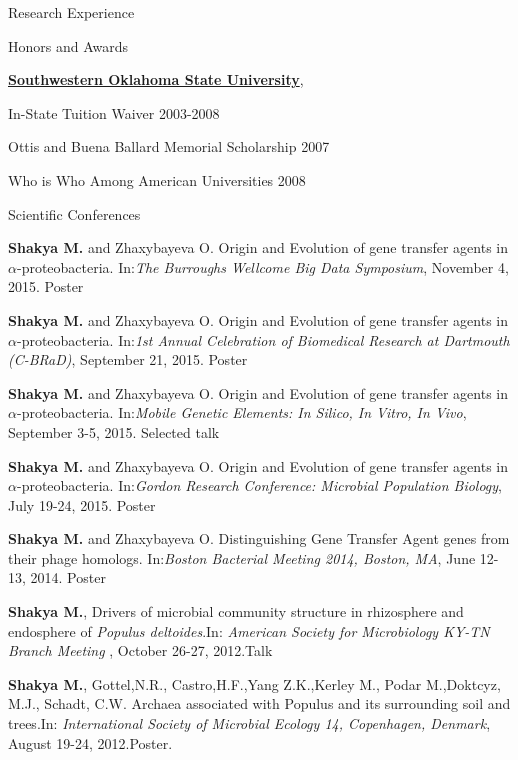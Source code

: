 \documentclass{resume} %
\begin{document}
\begin{rSection}{Research Experience}
\begin{rSection}{Honors and Awards}
\item \href{http://www.swosu.edu}{\textbf{Southwestern Oklahoma State University}},
\item In-State Tuition Waiver 2003-2008
\item Ottis and Buena Ballard Memorial Scholarship 2007
\item Who is Who Among American Universities 2008
\end{rSection}


\begin{rSection}{Scientific Conferences}

\item \textbf{Shakya M.} and Zhaxybayeva O. Origin and Evolution of gene transfer agents in $\alpha$-proteobacteria. In:\emph{The Burroughs Wellcome Big Data Symposium}, November 4, 2015. Poster

\item \textbf{Shakya M.} and Zhaxybayeva O. Origin and Evolution of gene transfer agents in $\alpha$-proteobacteria. In:\emph{1st Annual Celebration of Biomedical Research at Dartmouth (C-BRaD)}, September 21, 2015. Poster

\item \textbf{Shakya M.} and Zhaxybayeva O. Origin and Evolution of gene transfer agents in $\alpha$-proteobacteria. In:\emph{Mobile Genetic Elements: In Silico, In Vitro, In Vivo}, September 3-5, 2015. Selected talk

\item \textbf{Shakya M.} and Zhaxybayeva O. Origin and Evolution of gene transfer agents in $\alpha$-proteobacteria. In:\emph{Gordon Research Conference: Microbial Population Biology}, July 19-24, 2015. Poster

\item \textbf{Shakya M.} and Zhaxybayeva O. Distinguishing Gene Transfer Agent genes from their phage homologs. In:\emph{Boston Bacterial Meeting 2014, Boston, MA}, June 12-13, 2014. Poster

\item \textbf{Shakya M.}, Drivers of microbial community structure in rhizosphere and endosphere of \textit{Populus deltoides}.In: \emph{American Society for Microbiology KY-TN Branch Meeting }, October 26-27, 2012.Talk

\item  \textbf{Shakya M.}, Gottel,N.R., Castro,H.F.,Yang Z.K.,Kerley M., Podar M.,Doktcyz, M.J., Schadt, C.W. Archaea associated with Populus and its surrounding soil and trees.In: \emph{International Society of Microbial Ecology 14, Copenhagen, Denmark}, August 19-24, 2012.Poster.



\end{rSection}
\end{rSection}
\end{document}
